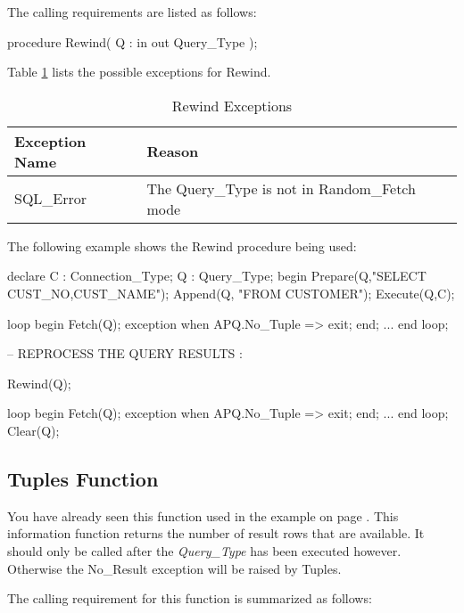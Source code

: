 \documentclass[english,letterpaper]{book}
\begin{document}
The calling requirements are listed as follows:

\begin{Code}
procedure Rewind(
   Q : in out Query_Type
);
\end{Code}

Table \ref{t:rwx} lists the possible exceptions for Rewind.

\begin{table}
   \begin{center}
      \begin{tabular}{ll}
         Exception Name    &  Reason\\
         \hline 
         SQL\_Error        &  The Query\_Type is not in Random\_Fetch mode\\
      \end{tabular}
   \end{center}
   \caption{Rewind Exceptions}\label{t:rwx}
\end{table}

The following example shows the Rewind procedure being used:

\begin{Example}
declare
   C : Connection_Type;
   Q : Query_Type;
begin
   Prepare(Q,"SELECT CUST_NO,CUST_NAME");
   Append(Q, "FROM CUSTOMER");
   Execute(Q,C);

   loop
      begin
         Fetch(Q);
      exception
         when APQ.No_Tuple =>
            exit;
      end;
      ...
   end loop;

   -- REPROCESS THE QUERY RESULTS :

   Rewind(Q);

   loop
      begin
         Fetch(Q);
      exception
         when APQ.No_Tuple =>
            exit;
      end;
      ...
   end loop;
   Clear(Q);
\end{Example}

\subsection{Tuples Function}

You have already seen this function used in the example on page
\pageref{Random Fetch Example}. This information function returns the
number of result rows that are available. It should only be called after
the \emph{Query\_Type} has been executed however. Otherwise the
No\_Result exception will be raised by Tuples.

The calling requirement for this function is summarized as follows:
\end{document}
